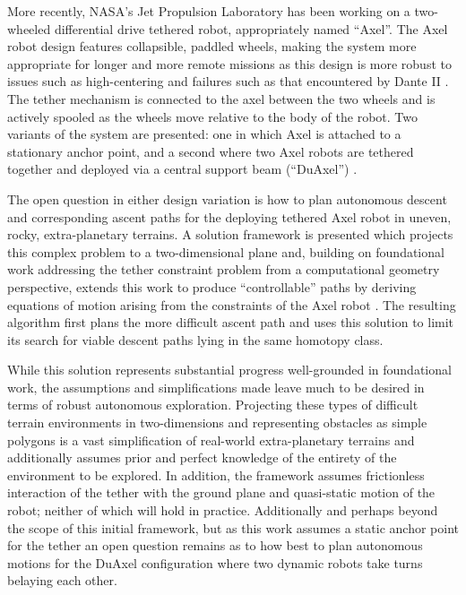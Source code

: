 \documentclass[12pt]{article}
\begin{document}
More recently, NASA's Jet Propulsion Laboratory has been working on a two-wheeled
differential drive tethered robot, appropriately named ``Axel''. The Axel robot 
design features collapsible, paddled wheels, making the system more appropriate for longer 
and more remote missions as this design is more robust to issues such as high-centering and 
failures such as that encountered by Dante II \cite{axel_design}. The tether mechanism is connected to the axel 
between the two wheels and is actively spooled as the wheels move relative to the body of the robot. 
Two variants of the system are presented: one in which Axel is attached to a stationary anchor point, 
and a second where two Axel robots are tethered together and deployed via a central support beam (``DuAxel'') \cite{duaxel}. 

The open question in either design variation is how to plan autonomous descent and corresponding 
ascent paths for the deploying tethered Axel robot in uneven, rocky, extra-planetary terrains. 
A solution framework is presented which projects this complex problem to a two-dimensional plane and, 
building on foundational work addressing the tether constraint problem from a computational geometry 
perspective, extends this work to produce ``controllable'' paths by deriving equations of motion arising from 
the constraints of the Axel robot \cite{axel_planning}. The resulting algorithm first plans the more difficult ascent path and
uses this solution to limit its search for viable descent paths lying in the same homotopy class. 

While this solution represents substantial progress well-grounded in foundational work, the 
assumptions and simplifications made leave much to be desired in terms of robust autonomous
exploration. Projecting these types of difficult terrain environments in two-dimensions and representing
obstacles as simple polygons is a vast simplification of real-world extra-planetary terrains and 
additionally assumes prior and perfect knowledge of the entirety of the environment to be explored. In addition,
the framework assumes frictionless interaction of the tether with the ground plane and quasi-static 
motion of the robot; neither of which will hold in practice. Additionally and perhaps beyond the scope 
of this initial framework, but as this work assumes a static anchor point for the tether an open 
question remains as to how best to plan autonomous motions for the DuAxel configuration where two 
dynamic robots take turns belaying each other.
\end{document}
